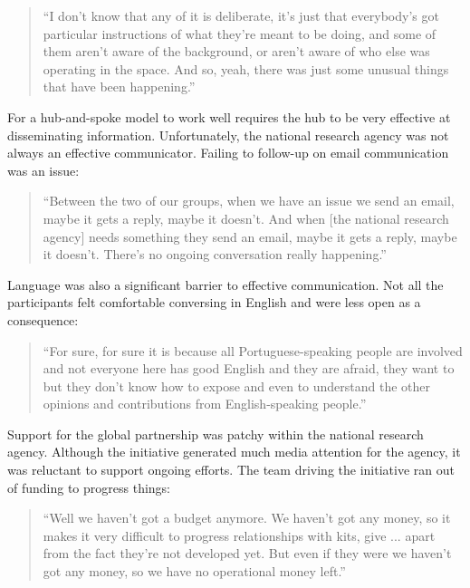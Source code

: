 \begin{quote}
\small
\enquote{I don't know that any of it is deliberate, it's just that everybody's got particular instructions of what they're meant to be doing, and some of them aren't aware of the background, or aren't aware of who else was operating in the space. And so, yeah, there was just some unusual things that have been happening.} \\
\end{quote}

For a hub-and-spoke model to work well requires the hub to be very effective at disseminating information. Unfortunately, the national research agency was not always an effective communicator. Failing to follow-up on email communication was an issue:

\begin{quote}
\small
\enquote{Between the two of our groups, when we have an issue we send an email, maybe it gets a reply, maybe it doesn't. And when [the national research agency] needs something they send an email, maybe it gets a reply, maybe it doesn't. There's  no ongoing conversation really happening.} \\
\end{quote}

Language was also a significant barrier to effective communication. Not all the participants felt comfortable conversing in English and were less open as a consequence:

\begin{quote}
\small
\enquote{For sure, for sure it is because all Portuguese-speaking people are involved and not everyone here has good English and they are afraid, they want to but they don't know how to expose and even to understand the other opinions and contributions from English-speaking people.} \\
\end{quote}

Support for the global partnership was patchy within the national research agency. Although the initiative generated much media attention for the agency, it was reluctant to support ongoing efforts. The team driving the initiative ran out of funding to progress things: 

\begin{quote}
\small
\enquote{Well we haven't got a budget anymore.  We haven't got any money, so it makes it very difficult to progress relationships with kits, give ... apart from the fact they're not developed yet. But even if they were we haven't got any money, so we have no operational money left.} \\
\end{quote}

